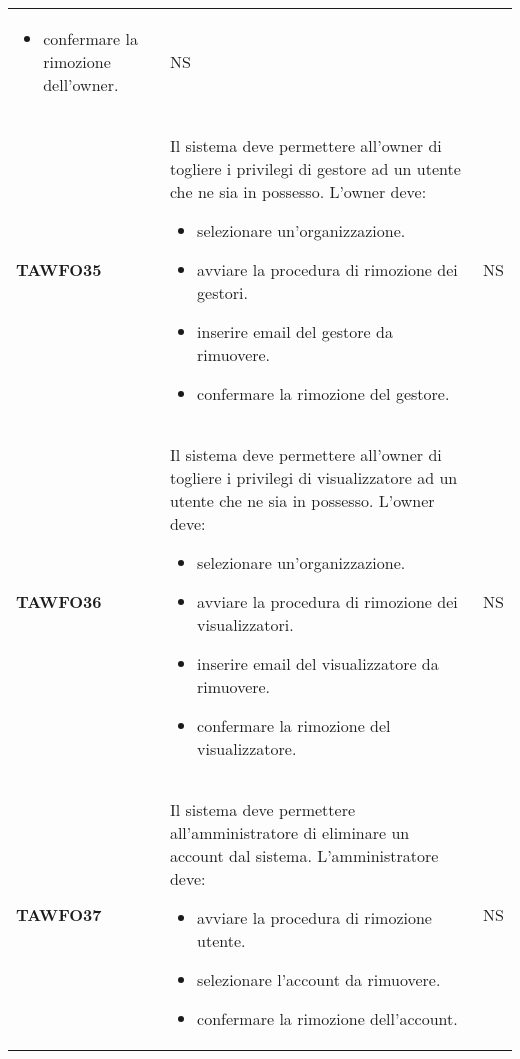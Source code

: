 \documentclass[../piano-di-qualifica.tex]{subfiles}
\begin{document}
\begin{centering}
\begin{longtable}[H]{>{\centering\bfseries}m{3cm} >{}p{10cm} >{\centering\arraybackslash}m{3cm}}
\begin{itemize}
                            \item confermare la rimozione dell'owner.
                          \end{itemize}
                      & NS \\
        TAWFO35       & Il sistema deve permettere all'owner di togliere i privilegi di gestore ad un utente che ne sia in possesso. \newline
                        L'owner deve:
                          \begin{itemize}
                            \item selezionare un'organizzazione.
                            \item avviare la procedura di rimozione dei gestori.
                            \item inserire email del gestore da rimuovere.
                            \item confermare la rimozione del gestore.
                          \end{itemize}
                      & NS \\
        TAWFO36       & Il sistema deve permettere all'owner di togliere i privilegi di visualizzatore ad un utente che ne sia in possesso. \newline
                        L'owner deve:
                          \begin{itemize}
                            \item selezionare un'organizzazione.
                            \item avviare la procedura di rimozione dei visualizzatori.
                            \item inserire email del visualizzatore da rimuovere.
                            \item confermare la rimozione del visualizzatore.
                          \end{itemize}
                      & NS \\
        TAWFO37       & Il sistema deve permettere all'amministratore di eliminare un account dal sistema. \newline
                        L'amministratore deve:
                          \begin{itemize}
                            \item avviare la procedura di rimozione utente.
                            \item selezionare l'account da rimuovere.
                            \item confermare la rimozione dell'account.
                          \end{itemize}
                      & NS \\


\end{longtable}
\end{centering}
\end{document}
